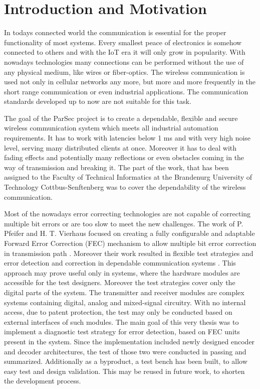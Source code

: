 \chapter{Introduction and Motivation} \label{ch:int}
In todays connected world the communication is essential for the proper functionality of most systems. Every smallest peace of electronics is somehow connected to others and with the IoT era it will only grow in popularity. With nowadays technologies many connections can be performed without the use of any physical medium, like wires or fiber-optics. The wireless communication is used not only in cellular networks any more, but more and more frequently in the short range communication or even industrial applications. The communication standards developed up to now are not suitable for this task.

The goal of the ParSec project is to create a dependable, flexible and secure wireless communication system which meets all industrial automation requirements. It has to work with latencies below 1 ms and with very high noise level, serving many distributed clients at once. Moreover it has to deal with fading effects and potentially many reflections or even obstacles coming in the way of transmission and breaking it. The part of the work, that has been assigned to the Faculty of Technical Informatics at the Brandenurg University of Technology Cottbus-Senftenberg was to cover the dependability of the wireless communication.

Most of the nowadays error correcting technologies are not capable of correcting multiple bit errors or are too slow to meet the new challenges. The work of P. Pfeifer and H. T. Vierhaus focused on creating a fully configurable and adaptable Forward Error Correction (FEC) mechanism to allow multiple bit error correction in transmission path \cite{art:Pfeifer}. Moreover their work resulted in flexible test strategies and error detection and correction in dependable communication systems \cite{art:Gleichner}. This approach may prove useful only in systems, where the hardware modules are accessible for the test designers. Moreover the test strategies cover only the digital parts of the system. The transmitter and receiver modules are complex systems containing digital, analog and mixed-signal circuitry. With no internal access, due to patent protection, the test may only be conducted based on external interfaces of such modules. The main goal of this very thesis was to implement a diagnostic test strategy for error detection, based on FEC units present in the system. Since the implementation included newly designed encoder and decoder architectures, the test of those two were conducted in passing and summarized. Additionally as a byproduct, a test bench has been built, to allow easy test and design validation. This may be reused in future work, to shorten the development process.

